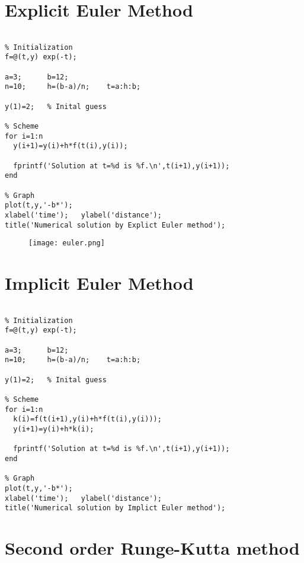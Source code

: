 \section{Explicit Euler Method}

\begin{verbatim}

% Initialization
f=@(t,y) exp(-t);

a=3;      b=12;
n=10;     h=(b-a)/n;    t=a:h:b;

y(1)=2;   % Inital guess

% Scheme
for i=1:n
  y(i+1)=y(i)+h*f(t(i),y(i));

  fprintf('Solution at t=%d is %f.\n',t(i+1),y(i+1));
end

% Graph
plot(t,y,'-b*');
xlabel('time');   ylabel('distance');
title('Numerical solution by Explict Euler method');
\end{verbatim}

\begin{figure}[h]
  \centering
  \texttt{[image: euler.png]}
\end{figure}

\vspace{5mm}

\section{Implicit Euler Method}

\begin{verbatim}

% Initialization
f=@(t,y) exp(-t);

a=3;      b=12;
n=10;     h=(b-a)/n;    t=a:h:b;

y(1)=2;   % Inital guess

% Scheme
for i=1:n
  k(i)=f(t(i+1),y(i)+h*f(t(i),y(i)));
  y(i+1)=y(i)+h*k(i);

  fprintf('Solution at t=%d is %f.\n',t(i+1),y(i+1));
end

% Graph
plot(t,y,'-b*');
xlabel('time');   ylabel('distance');
title('Numerical solution by Implict Euler method');
\end{verbatim}
\clearpage

\section{Second order Runge-Kutta method}

